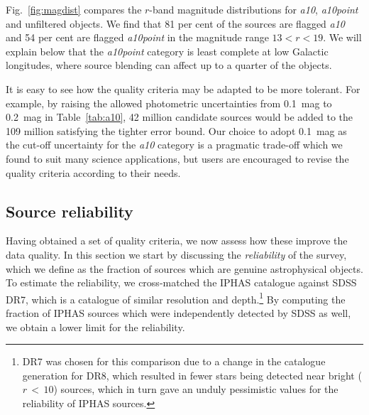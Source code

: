 \documentclass[a4paper,useAMS,usenatbib]{mn2e}
\begin{document}
{Fig.~\ref{fig:magdist} compares the $r$-band magnitude
distributions for \emph{a10}, \emph{a10point}
and unfiltered objects.
We find that 81 per cent of the sources 
are flagged \emph{a10}
and 54 per cent are flagged \emph{a10point}
in the magnitude range $13 < r < 19$.
We will explain below that the
\emph{a10point} category is least complete
at low Galactic longitudes,
where source blending can affect
up to a quarter of the objects.

It is easy to see how the quality criteria
may be adapted to be more tolerant.
For example, by raising the allowed photometric uncertainties
from 0.1~mag to 0.2~mag in Table~\ref{tab:a10},
42 million candidate sources would be added to the 109 
million satisfying the tighter error bound.
Our choice to adopt 0.1~mag as the cut-off uncertainty
for the \emph{a10} category is a pragmatic trade-off
which we found to suit many science applications,
but users are encouraged 
to revise the quality criteria according to their needs.


\subsection{Source reliability}
\label{sec:reliability}

Having obtained a set of quality criteria,
we now assess how these improve the data quality.
In this section we start by discussing
the \emph{reliability} of the survey,
which we define as the fraction of sources
which are genuine astrophysical objects.
To estimate the reliability, we cross-matched the IPHAS catalogue
against SDSS DR7,
which is a catalogue of similar resolution and depth.\footnote{DR7 was chosen for this comparison due to a change in 
the catalogue generation for DR8, which resulted in fewer stars being 
detected near bright ($r\,<\,10$) sources, which in turn gave an unduly 
pessimistic values for the reliability of IPHAS sources.}
By computing the fraction of IPHAS sources which were
independently detected by SDSS as well,
we obtain a lower limit for the reliability.




}
\end{document}
